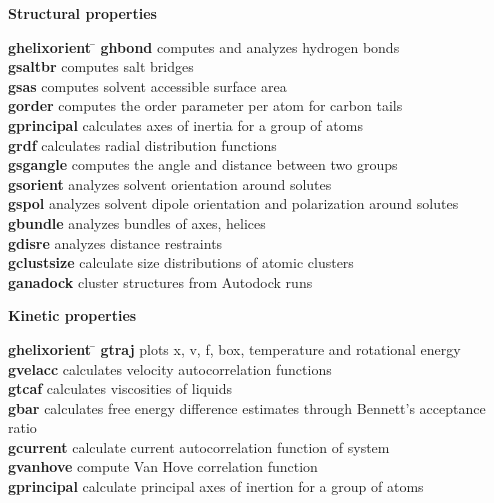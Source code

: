 \begin{description}
\item {\large\bf Structural properties}
\vspace{-2ex}\begin{tabbing}
{\bf g\us{}helixorient} \= \kill
{\bf g\us{}hbond} \> computes and analyzes hydrogen bonds \\
{\bf g\us{}saltbr} \> computes salt bridges \\
{\bf g\us{}sas} \> computes solvent accessible surface area \\
{\bf g\us{}order} \> computes the order parameter per atom for carbon tails \\
{\bf g\us{}principal} \> calculates axes of inertia for a group of atoms \\
{\bf g\us{}rdf} \> calculates radial distribution functions \\
{\bf g\us{}sgangle} \> computes the angle and distance between two groups \\
{\bf g\us{}sorient} \> analyzes solvent orientation around solutes \\
{\bf g\us{}spol} \> analyzes solvent dipole orientation and polarization around solutes \\
{\bf g\us{}bundle} \> analyzes bundles of axes, {\eg} helices \\
{\bf g\us{}disre} \> analyzes distance restraints \\
{\bf g\us{}clustsize} \> calculate size distributions of atomic clusters \\
{\bf g\us{}anadock} \> cluster structures from Autodock runs \\
\end{tabbing}\vspace{-2ex}

\item {\large\bf Kinetic properties}
\vspace{-2ex}\begin{tabbing}
{\bf g\us{}helixorient} \= \kill
{\bf g\us{}traj} \> plots x, v, f, box, temperature and rotational energy \\
{\bf g\us{}velacc} \> calculates velocity autocorrelation functions \\
{\bf g\us{}tcaf} \> calculates viscosities of liquids \\
{\bf g\us{}bar} \> calculates free energy difference estimates through Bennett's acceptance ratio \\
{\bf g\us{}current} \> calculate current autocorrelation function of system \\
{\bf g\us{}vanhove} \> compute Van Hove correlation function \\
{\bf g\us{}principal} \> calculate principal axes of inertion for a group of atoms \\
\end{tabbing}\vspace{-2ex}


\end{description}

